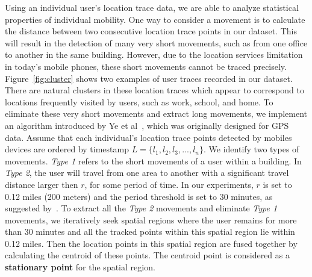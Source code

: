 Using an individual user's location trace data, we are able to analyze
statistical properties of individual mobility. One way to consider a movement is
to calculate the distance between two consecutive location trace points in our
dataset.  This will result in the detection of many very short movements, such
as from one office to another in the same building. However, due to the location
services limitation in today's mobile phones, these short movements cannot be
traced precisely. Figure~\ref{fig:cluster} shows two examples of user traces
recorded in our dataset. There are natural clusters in these location traces
which appear to correspond to locations frequently visited by users, such as
work, school, and home.
To eliminate these very short movements and extract long movements, we implement
an algorithm introduced by Ye et al~\cite{ye2009mining}, which was originally
designed for GPS data. Assume that each individual's location trace points
detected by mobiles devices are ordered by timestamp $L = \{l_1, l_2, l_3,...,
l_n\}$. We identify two types of movements.
\textit{Type 1} refers to the short movements of a user within a building. In
\textit{Type 2}, the user will travel from one area to another with a
significant travel distance larger then $r$, for some period of time. In our
experiments, $r$ is set to 0.12 miles (200 meters) and the period threshold is
set to 30 minutes, as suggested by~\cite{ye2009mining}. To extract all the
\textit{Type 2} movements and eliminate \textit{Type 1} movements, we
iteratively seek spatial regions where the user remains for more than 30 minutes
and all the tracked points within this spatial region lie within 0.12 miles.
Then the location points in this spatial region are fused together by
calculating the centroid of these points. The centroid point is considered as a
\textbf{stationary point} for the spatial region.

\begin{comment}
\begin{observation}
Users single movement distances and average number of movements per day 
on weekends are higher than on weekdays.
\end{observation}
\end{comment}


